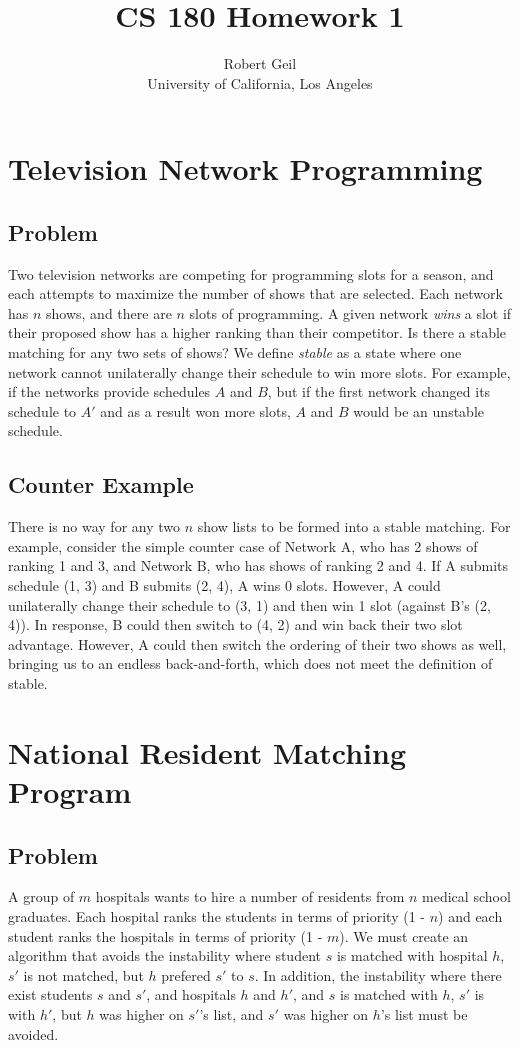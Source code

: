 \documentclass[titlepage]{article}
\title{CS 180 Homework 1}
\author{Robert Geil \\
University of California, Los Angeles
}
\numberwithin{equation}{subsection}
\begin{document}
\maketitle

\section{Television Network Programming}
\subsection{Problem}
Two television networks are competing for programming slots for a season,
and each attempts to maximize the number of shows that are selected. Each
network has $n$ shows, and there are $n$ slots of programming. A given network
\textit{wins} a slot if their proposed show has a higher ranking than their
competitor. Is there a stable matching for any two sets of shows? We define
\textit{stable} as a state where one network cannot unilaterally change their
schedule to win more slots. For example, if the networks provide schedules $A$ and $B$,
but if the first network changed its schedule to $A'$ and as a result won more slots,
$A$ and $B$ would be an unstable schedule.
\subsection{Counter Example}
There is no way for any two $n$ show lists to be formed into a stable matching.
For example, consider the simple counter case of Network A, who has 2 shows of ranking
1 and 3, and Network B, who has shows of ranking 2 and 4. If A submits schedule
(1, 3) and B submits (2, 4), A wins 0 slots. However, A could unilaterally 
change their schedule to (3, 1) and then win 1 slot (against B's (2, 4)). In
response, B could then switch to (4, 2) and win back their two slot advantage. However,
A could then switch the ordering of their two shows as well, bringing us to an endless
back-and-forth, which does not meet the definition of stable.
\section{National Resident Matching Program}
\subsection{Problem}
A group of $m$ hospitals wants to hire a number of residents from $n$ medical
school graduates. Each hospital ranks the students in terms of priority (1 - $n$) and
each student ranks the hospitals in terms of priority (1 - $m$). We must create
an algorithm that avoids the instability where student $s$ is matched with hospital $h$,
$s'$ is not matched, but $h$ prefered $s'$ to $s$. In addition, the instability where there exist
students $s$ and $s'$, and hospitals $h$ and $h'$, and $s$ is matched with $h$, $s'$ is with $h'$, but
$h$ was higher on $s'$'s list, and $s'$ was higher on $h$'s list must be avoided.
\end{document}
